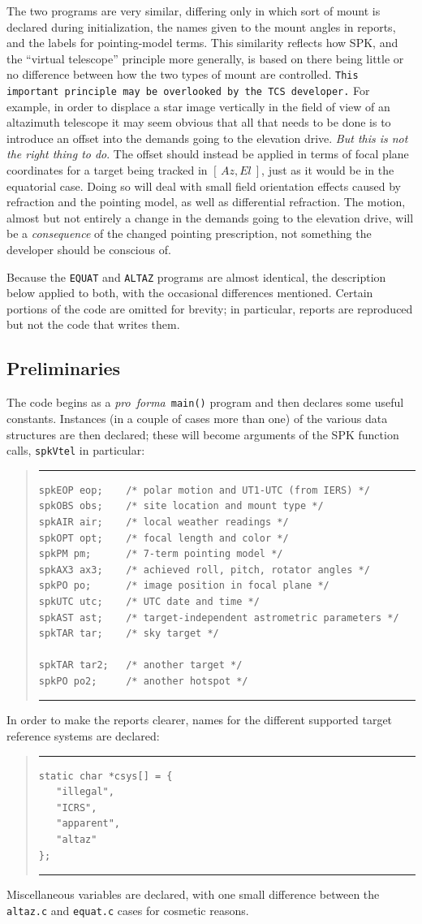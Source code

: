 \documentclass[11pt,fleqn,twoside,\paper]{article}
\renewcommand{\_}{{\tt\char'137}}     %
\newcommand{\azel}      {$[\,Az,El~]$}
\newcommand{\scode}     {\goodbreak
                         \begin{quote}
                         \vspace{-6ex}
                         \rule[-2ex]{36em}{0.03ex}}
\newcommand{\ecode}     {\rule[2ex]{36em}{0.03ex}
                         \end{quote}
                         \vspace{-4ex}
                         \goodbreak}
\begin{document}
The two programs are very similar, differing only in which
sort of mount is declared during initialization, the names
given to the mount angles in reports, and the labels for
pointing-model terms.  This similarity reflects how
SPK, and the ``virtual telescope''
principle more generally, is based on there
being little or no difference between how the two
types of mount are controlled.  {\tt This important principle
may be overlooked by the TCS developer.}  For example, in
order to displace a star image vertically in the field of view
of an altazimuth telescope it may seem obvious that all
that needs to be done is
to introduce an offset into the demands going to the
elevation drive.  {\it But this is not the right thing to do}.
The offset should instead be applied in terms of focal plane
coordinates for a target being tracked in \azel, just as it
would be in the equatorial case.  Doing so will deal with small
field orientation effects caused by refraction and the pointing
model, as well as differential refraction.  The motion, almost
but not entirely a change in the demands going to the elevation
drive, will be a {\it consequence}\/ of the changed pointing
prescription, not something the developer should be conscious of.

Because the {\tt EQUAT} and {\tt ALTAZ} programs are almost
identical, the description below applied to both, with the
occasional differences mentioned.  Certain portions of the code
are omitted for brevity;  in particular, reports are reproduced
but not the code that writes them.

\subsection{Preliminaries}
The code begins as a {\it pro~forma}\ {\tt main()} program and
then declares some useful constants.
Instances (in a couple of cases more than one) of the various
data structures are then declared;  these will become arguments
of the SPK function calls, {\tt spkVtel} in particular:
\scode\begin{verbatim}
spkEOP eop;    /* polar motion and UT1-UTC (from IERS) */
spkOBS obs;    /* site location and mount type */
spkAIR air;    /* local weather readings */
spkOPT opt;    /* focal length and color */
spkPM pm;      /* 7-term pointing model */
spkAX3 ax3;    /* achieved roll, pitch, rotator angles */
spkPO po;      /* image position in focal plane */
spkUTC utc;    /* UTC date and time */
spkAST ast;    /* target-independent astrometric parameters */
spkTAR tar;    /* sky target */

spkTAR tar2;   /* another target */
spkPO po2;     /* another hotspot */
\end{verbatim}\ecode
In order to make the reports clearer, names for the different
supported target reference systems are declared:
\scode\begin{verbatim}
static char *csys[] = {
   "illegal",
   "ICRS",
   "apparent",
   "altaz"
};
\end{verbatim}\ecode
Miscellaneous variables are declared, with one small difference between
the {\tt altaz.c} and {\tt equat.c} cases for cosmetic reasons.
\end{document}
